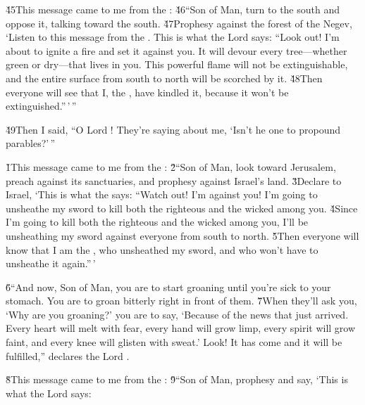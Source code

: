 \v{45}This message came to me from the : \v{46}``Son of Man, turn to the south and oppose it, talking toward the south. \v{47}Prophesy against the forest of the Negev, `Listen to this message from the . This is what the Lord  says: ``Look out! I'm about to ignite a fire and set it against you. It will devour every tree---whether green or dry---that lives in you. This powerful flame will not be extinguishable, and the entire surface from south to north will be scorched by it. \v{48}Then everyone will see that I, the , have kindled it, because it won't be extinguished.''\,'\,''

\v{49}Then I said, ``O Lord ! They're saying about me, `Isn't he one to propound parables?'\,''

\v{1}This message came to me from the : \v{2}``Son of Man, look toward Jerusalem, preach against its sanctuaries, and prophesy against Israel's land. \v{3}Declare to Israel, `This is what the  says: ``Watch out! I'm against you! I'm going to unsheathe my sword to kill both the righteous and the wicked among you. \v{4}Since I'm going to kill both the righteous and the wicked among you, I'll be unsheathing my sword against everyone from south to north. \v{5}Then everyone will know that I am the , who unsheathed my sword, and who won't have to unsheathe it again.''\,'

\v{6}``And now, Son of Man, you are to start groaning until you're sick to your stomach. You are to groan bitterly right in front of them. \v{7}When they'll ask you, `Why are you groaning?' you are to say, `Because of the news that just arrived. Every heart will melt with fear, every hand will grow limp, every spirit will grow faint, and every knee will glisten with sweat.' Look! It has come and it will be fulfilled,'' declares the Lord .

\v{8}This message came to me from the : \v{9}``Son of Man, prophesy and say, `This is what the Lord  says:

